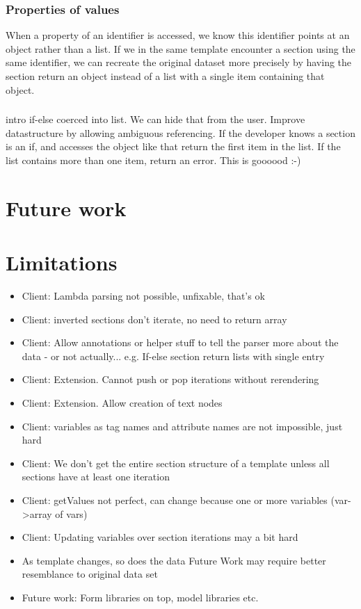 \documentclass[thesis.tex]{subfiles}
\begin{document}
\subsubsection{Properties of values}
When a property of an identifier is accessed, we know this identifier points at
an object rather than a list. If we in the same template encounter a section
using the same identifier, we can recreate the original dataset more precisely
by having the section return an object instead of a list with a single item
containing that object.

\subsubsection{}
intro if-else coerced into list. We can hide that from the user.
Improve datastructure by allowing ambiguous referencing. If the developer knows
a section is an if, and accesses the object like that return the first item in the list.
If the list contains more than one item, return an error. This is goooood :-)

\section{Future work}

\section{Limitations}
\begin{itemize}
	\item Client: Lambda parsing not possible, unfixable, that's ok
	\item Client: inverted sections don't iterate, no need to return array
	\item Client: Allow annotations or helper stuff to tell the parser more about the data - or not actually...
	      e.g. If-else section return lists with single entry
	\item Client: Extension. Cannot push or pop iterations without rerendering
	\item Client: Extension. Allow creation of text nodes
	\item Client: variables as tag names and attribute names are not impossible, just hard
	\item Client: We don't get the entire section structure of a template unless all
	      sections have at least one iteration
	\item Client: getValues not perfect, can change because one or more variables (var->array of vars)
	\item Client: Updating variables over section iterations may a bit hard
	\item As template changes, so does the data
	      Future Work may require better resemblance to original data set
	\item Future work: Form libraries on top, model libraries etc.
\end{itemize}
\end{document}
